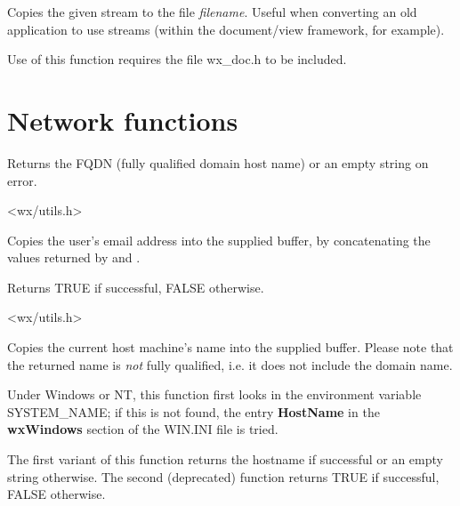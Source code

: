 Copies the given stream to the file {\it filename}. Useful when converting an old application to
use streams (within the document/view framework, for example).

Use of this function requires the file wx\_doc.h to be included.

\section{Network functions}\label{networkfunctions}

\label{wxgetfullhostname}


Returns the FQDN (fully qualified domain host name) or an empty string on
error.




<wx/utils.h>

\label{wxgetemailaddress}


Copies the user's email address into the supplied buffer, by
concatenating the values returned by \rtfsp
and .

Returns TRUE if successful, FALSE otherwise.


<wx/utils.h>

\label{wxgethostname}



Copies the current host machine's name into the supplied buffer. Please note
that the returned name is {\it not} fully qualified, i.e. it does not include
the domain name.

Under Windows or NT, this function first looks in the environment
variable SYSTEM\_NAME; if this is not found, the entry {\bf HostName}\rtfsp
in the {\bf wxWindows} section of the WIN.INI file is tried.

The first variant of this function returns the hostname if successful or an
empty string otherwise. The second (deprecated) function returns TRUE
if successful, FALSE otherwise.

